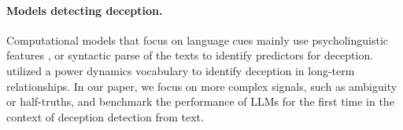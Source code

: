 \paragraph{Models detecting deception.}
Computational models that focus on language cues mainly use psycholinguistic features \cite{Grlea2016PsycholinguisticFF, soldner2019box}, or syntactic parse of the texts \cite{soldner2019box} to identify predictors for deception. \citet{ho2016computer} utilized a power dynamics vocabulary to identify deception in long-term relationships. In our paper, we focus on more complex signals, such as ambiguity or half-truths, and benchmark the performance of LLMs for the first time in the context of deception detection from text.